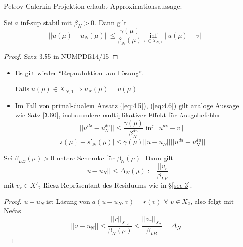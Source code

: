 Petrov-Galerkin Projektion erlaubt Approximationsaussage:

\begin{satz}
Sei $a$ inf-sup stabil mit $\beta_N > 0$. Dann gilt
\[
	||u(\mu) - u_N(\mu)|| \leq \frac{\gamma(\mu)}{\beta_N(\mu)} \inf\limits_{v \in X_{N,1}} ||u(\mu) - v||
\]
\begin{proof}
Satz 3.55 in NUMPDE14/15
\end{proof}
\end{satz}

\begin{bem} \beginwithlistbem
	\begin{itemize}
		\item Es gilt wieder ``Reproduktion von Lösung'':
		
		Falls $u(\mu) \in X_{N,1} \Rightarrow u_N(\mu) = u(\mu)$
		\item Im Fall von primal-dualem Ansatz (\ref{eq:4.5}), (\ref{eq:4.6}) gilt analoge Aussage wie Satz \ref{3.60}, insbesondere multiplikativer Effekt für Ausgabefehler
		\[
			||u^{du} - u_N^{du}|| \leq \frac{\gamma(\mu)}{\beta_N^{du}} \inf ||u^{du} - v||
		\]
		\[
			| s(\mu) - s'_N(\mu)| \leq \gamma(\mu) ||u-u_N|| ||u^{du} - u_N^{du}||
		\]
	\end{itemize}
\end{bem}

\begin{satz}
Sei $\beta_{LB}(\mu) > 0$ untere Schranke für $\beta_N(\mu)$. Dann gilt
\[
	||u - u_N|| \leq \Delta_N (\mu) := \frac{||v_r}{\beta_{LB}}
\]
mit $v_r \in X'_2$ Riesz-Repräsentant des Residuums wie in §\ref{sec-3}.
\begin{proof}
$u-u_N$ ist Lösung von $a(u-u_N,v) = r(v) \,\, \forall \,\, v \in X_2$, also folgt mit Ne\v{c}as
\[
	||u-u_N|| \leq \frac{||r||_{X'_2}}{\beta_N(\mu)} \leq \frac{||v_r||_{X_2}}{\beta_{LB}} = \Delta_N
\]
\end{proof}
\end{satz}


